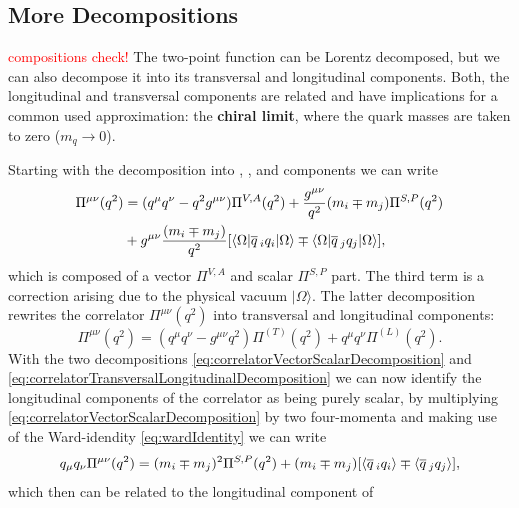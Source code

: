 \documentclass[../../index.tex]{subfiles}
\begin{document}
\subsection{More Decompositions}
\textcolor{red}{compositions check!} The two-point function can be Lorentz
decomposed, but we can also decompose it into its transversal and longitudinal
components. Both, the longitudinal and transversal components are related and
have implications for a common used approximation: the \textbf{chiral limit},
where the quark masses are taken to zero (\(m_q \to 0\)).

Starting with the decomposition into ,
,  and 
components we can write \cite{Broadhurst1981,Jamin1992}
\begin{equation}
  \label{eq:correlatorVectorScalarDecomposition}
  \begin{split}
    \Pi^{\mu\nu}(q^2) &= (q^\mu q^\nu - q^2 g^{\mu\nu}) \Pi^{V,A}(q^2) + \frac{g^{\mu\nu}}{q^2} (m_i \mp m_j)\Pi^{S,P}(q^2) \\
    &+ g^{\mu\nu}\frac{(m_i \mp m_j)}{q^2} [ \langle\Omega\vert \overline{q}\,_i q_i
    \vert\Omega\rangle \mp \langle\Omega\vert \overline{q}\,_j q_j
    \vert\Omega\rangle],
  \end{split}
\end{equation}
which is composed of a vector $\Pi^{V,A}$ and scalar $\Pi^{S,P}$ part. The third
term is a correction arising due to the physical vacuum $|\Omega\rangle$. The
latter decomposition rewrites the correlator $\Pi^{\mu\nu}(q^2)$ into
transversal and longitudinal components:
\begin{equation}
  \label{eq:correlatorTransversalLongitudinalDecomposition}
  \Pi^{\mu\nu}(q^2) = (q^\mu q^\nu - g^{\mu\nu}q^2) \Pi^{(T)}(q^2) + q^\mu q^\nu \Pi^{(L)}(q^2).
\end{equation}
With the two decompositions \cref{eq:correlatorVectorScalarDecomposition} and
\cref{eq:correlatorTransversalLongitudinalDecomposition} we can now identify the
longitudinal components of the correlator as being purely scalar, by multiplying
\cref{eq:correlatorVectorScalarDecomposition} by two four-momenta and making use
of the Ward-idendity \cref{eq:wardIdentity} we can write
\begin{equation}
  q_\mu q_\nu \Pi^{\mu\nu}(q^2) = (m_i \mp m_j)^2 \Pi^{S,P}(q^2) + (m_i \mp m_j)[\langle \overline{q}\,_i q_i \rangle \mp \langle \overline{q}\,_j q_j \rangle],
\end{equation}
which then can be related to the longitudinal component of
\end{document}
